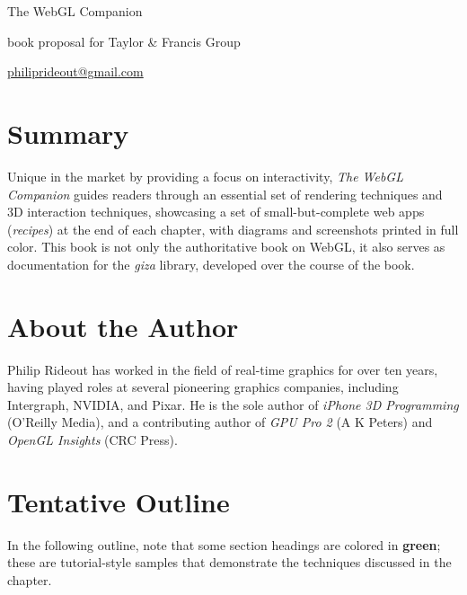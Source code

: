 \thispagestyle{empty}
\label{Proposal}
\LARGE

\noindent The WebGL Companion

\small

\vspace{0.25in}
\noindent book proposal for Taylor \& Francis Group

\noindent \href{mailto:philiprideout@gmail.com}{philiprideout@gmail.com}
\normalsize

\section*{Summary}
Unique in the market by providing a focus on interactivity, \emph{The WebGL Companion} guides readers through an essential set of rendering techniques and 3D interaction techniques, showcasing a set of small-but-complete web apps (\emph{recipes}) at the end of each chapter, with diagrams and screenshots printed in full color.  This book is not only the authoritative book on WebGL, it also serves as documentation for the \emph{giza} library, developed over the course of the book.

\section*{About the Author}

Philip Rideout has worked in the field of real-time graphics for over ten years, having played roles at several pioneering graphics companies, including Intergraph, NVIDIA, and Pixar.  He is the sole author of \emph{iPhone 3D Programming} (O'Reilly Media), and a contributing author of \emph{GPU Pro 2} (A K Peters) and \emph{OpenGL Insights} (CRC Press).

\section*{Tentative Outline}


In the following outline, note that some section headings are colored in \textbf{\textcolor{mygreen}{green}}; these are tutorial-style samples that demonstrate the techniques discussed in the chapter.

\newcommand{\rrecipe}[1] {\section{\textcolor{mygreen}{#1} } }
\hypersetup{colorlinks,linkcolor=black}
\newcommand{\summary}[1]{\addtocontents{toc}{\setlength{\leftskip}{15pt} \noindent  \footnotesize\textcolor{mygray}{#1}\normalsize\protect\par}}

